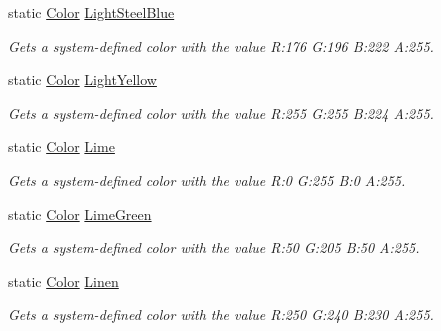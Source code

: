 \begin{DoxyCompactItemize}
static \hyperlink{struct_microsoft_1_1_xna_1_1_framework_1_1_color}{Color} \hyperlink{struct_microsoft_1_1_xna_1_1_framework_1_1_color_a4bca4118f2e489b7f4916c4ba359cd9c}{Light\+Steel\+Blue}
\begin{DoxyCompactList}\small\item\em Gets a system-\/defined color with the value R\+:176 G\+:196 B\+:222 A\+:255.\end{DoxyCompactList}\item 
static \hyperlink{struct_microsoft_1_1_xna_1_1_framework_1_1_color}{Color} \hyperlink{struct_microsoft_1_1_xna_1_1_framework_1_1_color_a0f28352c810f71655199ed4258baeb78}{Light\+Yellow}
\begin{DoxyCompactList}\small\item\em Gets a system-\/defined color with the value R\+:255 G\+:255 B\+:224 A\+:255.\end{DoxyCompactList}\item 
static \hyperlink{struct_microsoft_1_1_xna_1_1_framework_1_1_color}{Color} \hyperlink{struct_microsoft_1_1_xna_1_1_framework_1_1_color_a753b6727ac7cd04969ffe9a24a1913ba}{Lime}
\begin{DoxyCompactList}\small\item\em Gets a system-\/defined color with the value R\+:0 G\+:255 B\+:0 A\+:255.\end{DoxyCompactList}\item 
static \hyperlink{struct_microsoft_1_1_xna_1_1_framework_1_1_color}{Color} \hyperlink{struct_microsoft_1_1_xna_1_1_framework_1_1_color_a678dcf6808989867c0b52242d4194df3}{Lime\+Green}
\begin{DoxyCompactList}\small\item\em Gets a system-\/defined color with the value R\+:50 G\+:205 B\+:50 A\+:255.\end{DoxyCompactList}\item 
static \hyperlink{struct_microsoft_1_1_xna_1_1_framework_1_1_color}{Color} \hyperlink{struct_microsoft_1_1_xna_1_1_framework_1_1_color_a7e6151709b8d5a821466d189f319a7a6}{Linen}
\begin{DoxyCompactList}\small\item\em Gets a system-\/defined color with the value R\+:250 G\+:240 B\+:230 A\+:255.\end{DoxyCompactList}\item 

\end{DoxyCompactItemize}
